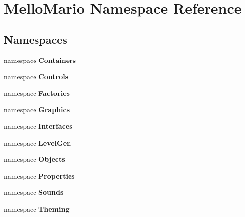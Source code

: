 \section{Mello\+Mario Namespace Reference}
\label{namespaceMelloMario}
\subsection*{Namespaces}
\begin{DoxyCompactItemize}
\item 
namespace \textbf{ Containers}
\item 
namespace \textbf{ Controls}
\item 
namespace \textbf{ Factories}
\item 
namespace \textbf{ Graphics}
\item 
namespace \textbf{ Interfaces}
\item 
namespace \textbf{ Level\+Gen}
\item 
namespace \textbf{ Objects}
\item 
namespace \textbf{ Properties}
\item 
namespace \textbf{ Sounds}
\item 
namespace \textbf{ Theming}
\end{DoxyCompactItemize}
